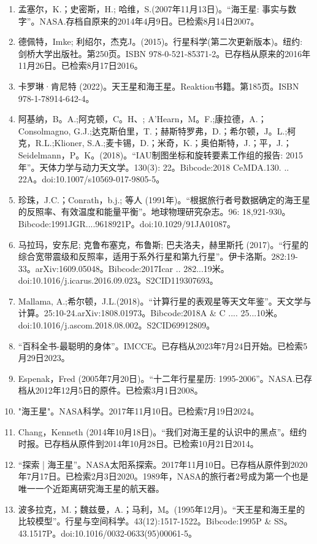 \begin{enumerate}
\item 孟塞尔，K.；史密斯，H.; 哈维，S.(2007年11月13日)。“海王星: 事实与数字”。NASA.存档自原来的2014年4月9日。已检索8月14日2007。
\item 德佩特，Imke; 利绍尔，杰克J。(2015)。行星科学(第二次更新版本)。纽约: 剑桥大学出版社。第250页。ISBN 978-0-521-85371-2。已存档从原来的2016年11月26日。已检索8月17日2016。
\item 卡罗琳·肯尼特 (2022)。天王星和海王星。Reaktion书籍。第185页。ISBN 978-1-78914-642-4。
\item 阿基纳，B。A.;阿克顿，C。H、; A'Hearn，M。F.;康拉德，A.；Consolmagno, G.J.;达克斯伯里，T.；赫斯特罗弗，D.；希尔顿，J。L.;柯克，R.L.;Klioner, S.A.;麦卡锡，D.；米奇，K.；奥伯斯特，J.；平，J.；Seidelmann，P。K。(2018)。“IAU制图坐标和旋转要素工作组的报告: 2015年”。天体力学与动力天文学。130(3): 22。Bibcode:2018 CeMDA.130. .. 22A。doi:10.1007/s10569-017-9805-5。
\item 珍珠，J.C.；Conrath，b.j.; 等人 (1991年)。“根据旅行者号数据确定的海王星的反照率、有效温度和能量平衡”。地球物理研究杂志。96: 18,921-930。Bibcode:1991JGR....9618921P。doi:10.1029/91JA01087。
\item 马拉玛，安东尼; 克鲁布塞克，布鲁斯; 巴夫洛夫，赫里斯托 (2017)。“行星的综合宽带震级和反照率，适用于系外行星和第九行星”。伊卡洛斯。282:19-33。arXiv:1609.05048。Bibcode:2017Icar .. 282...19米。doi:10.1016/j.icarus.2016.09.023。S2CID119307693。  
\item Mallama, A.;希尔顿，J.L.(2018)。“计算行星的表观星等天文年鉴”。天文学与计算。25:10-24.arXiv:1808.01973。Bibcode:2018A & C .... 25...10米。doi:10.1016/j.ascom.2018.08.002。S2CID69912809。  
\item “百科全书-最聪明的身体”。IMCCE。已存档从2023年7月24日开始。已检索5月29日2023。
\item Espenak，Fred (2005年7月20日)。“十二年行星星历: 1995-2006”。NASA.已存档从2012年12月5日的原件。已检索3月1日2008。
\item "海王星"。NASA科学。2017年11月10日。已检索7月19日2024。
\item Chang，Kenneth (2014年10月18日)。“我们对海王星的认识中的黑点”。纽约时报。已存档从原件到2014年10月28日。已检索10月21日2014。
\item “探索 | 海王星”。NASA太阳系探索。2017年11月10日。已存档从原件到2020年7月17日。已检索2月3日2020。1989年，NASA的旅行者2号成为第一个也是唯一一个近距离研究海王星的航天器。
\item 波多拉克，M.；魏兹曼，A.；马利，M。(1995年12月)。“天王星和海王星的比较模型”。行星与空间科学。43(12):1517-1522。Bibcode:1995P & SS。43.1517P。doi:10.1016/0032-0633(95)00061-5。

\end{enumerate}
